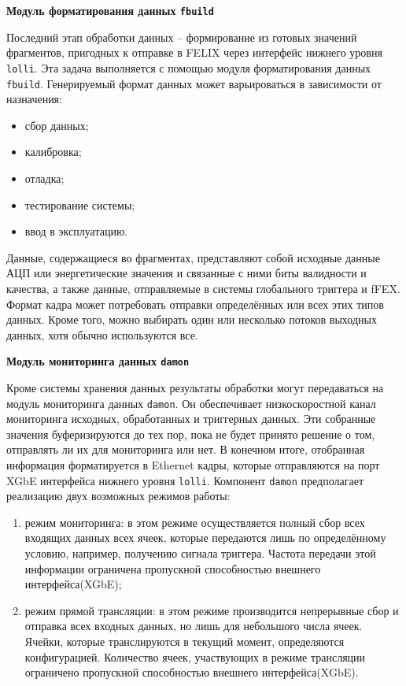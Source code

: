 \textbf{Модуль форматирования данных \texttt{fbuild}}\par
Последний этап обработки данных -- формирование из готовых значений фрагментов, пригодных к отправке в FELIX через интерфейс нижнего уровня \texttt{lolli}. Эта задача выполняется с помощью модуля форматирования данных \texttt{fbuild}. Генерируемый формат данных может варьироваться в зависимости от назначения:\par
\begin{itemize}
    \item сбор данных;
    \item калибровка;
    \item отладка;
    \item тестирование системы;
    \item ввод в эксплуатацию.
\end{itemize}\par
Данные, содержащиеся во фрагментах, представляют собой исходные данные АЦП или энергетические значения и связанные с ними биты валидности и качества, а также данные, отправляемые в системы глобального триггера и fFEX. Формат кадра может потребовать отправки определённых или всех этих типов данных. Кроме того, можно выбирать один или несколько потоков выходных данных, хотя обычно используются все.\par
\textbf{Модуль мониторинга данных \texttt{damon}}\par
Кроме системы хранения данных результаты обработки могут передаваться на модуль мониторинга данных \texttt{damon}. Он обеспечивает низкоскоростной канал мониторинга исходных, обработанных и триггерных данных. Эти собранные значения буферизируются до тех пор, пока не будет принято решение о том, отправлять ли их для мониторинга или нет. В конечном итоге, отобранная информация форматируется в Ethernet кадры, которые отправляются на порт XGbE интерфейса нижнего уровня \texttt{lolli}. Компонент \texttt{damon} предполагает реализацию двух возможных режимов работы:\par
\begin{enumerate}
    \item режим мониторинга: в этом режиме осуществляется полный сбор всех входящих данных всех ячеек, которые передаются лишь по определённому условию, например, получению сигнала триггера. Частота передачи этой информации ограничена пропускной способностью внешнего интерфейса(XGbE);
    \item режим прямой трансляции: в этом режиме производится непрерывные сбор и отправка всех входных данных, но лишь для небольшого числа ячеек. Ячейки, которые транслируются в текущий момент, определяются конфигурацией. Количество ячеек, участвующих в режиме трансляции ограничено пропускной способностью внешнего интерфейса(XGbE).
\end{enumerate}\par
